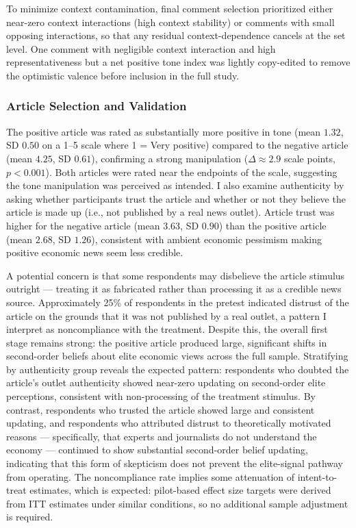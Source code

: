 \documentclass[
  12pt]{article}
\begin{document}
To minimize context contamination, final comment selection prioritized
either near-zero context interactions (high context stability) or
comments with small opposing interactions, so that any residual
context-dependence cancels at the set level. One comment with negligible
context interaction and high representativeness but a net positive tone
index was lightly copy-edited to remove the optimistic valence before
inclusion in the full study.

\subsubsection{Article Selection and
Validation}\label{article-selection-and-validation}

The positive article was rated as substantially more positive in tone
(mean \(1.32\), SD \(0.50\) on a 1--5 scale where 1 = Very positive)
compared to the negative article (mean \(4.25\), SD \(0.61\)),
confirming a strong manipulation (\(\Delta \approx 2.9\) scale points,
\(p < 0.001\)). Both articles were rated near the endpoints of the
scale, suggesting the tone manipulation was perceived as intended. I
also examine authenticity by asking whether participants trust the
article and whether or not they believe the article is made up (i.e.,
not published by a real news outlet). Article trust was higher for the
negative article (mean \(3.63\), SD \(0.90\)) than the positive article
(mean \(2.68\), SD \(1.26\)), consistent with ambient economic pessimism
making positive economic news seem less credible.

A potential concern is that some respondents may disbelieve the article
stimulus outright --- treating it as fabricated rather than processing
it as a credible news source. Approximately 25\% of respondents in the
pretest indicated distrust of the article on the grounds that it was not
published by a real outlet, a pattern I interpret as noncompliance with
the treatment. Despite this, the overall first stage remains strong: the
positive article produced large, significant shifts in second-order
beliefs about elite economic views across the full sample. Stratifying
by authenticity group reveals the expected pattern: respondents who
doubted the article's outlet authenticity showed near-zero updating on
second-order elite perceptions, consistent with non-processing of the
treatment stimulus. By contrast, respondents who trusted the article
showed large and consistent updating, and respondents who attributed
distrust to theoretically motivated reasons --- specifically, that
experts and journalists do not understand the economy --- continued to
show substantial second-order belief updating, indicating that this form
of skepticism does not prevent the elite-signal pathway from operating.
The noncompliance rate implies some attenuation of intent-to-treat
estimates, which is expected: pilot-based effect size targets were
derived from ITT estimates under similar conditions, so no additional
sample adjustment is required.
\end{document}
